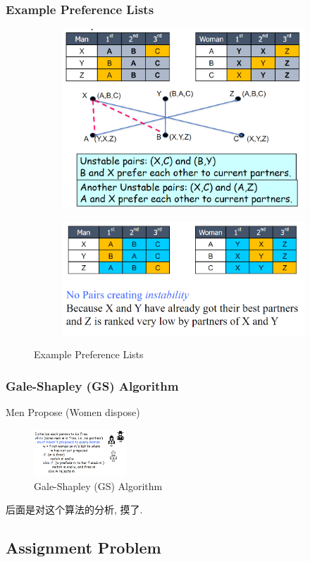 \subsubsection{Example Preference Lists}
\begin{figure}[H]
    \centering
    \begin{subfigure}{0.309\textwidth}
        \centering
        \includegraphics[width=\textwidth]{pic/DAA10/Example Preference Lists1}
    \end{subfigure}
    \begin{subfigure}{0.309\textwidth}
        \centering
        \includegraphics[width=\textwidth]{pic/DAA10/Example Preference Lists2}
    \end{subfigure}
    \caption{Example Preference Lists}
\end{figure}

\subsubsection{Gale-Shapley (GS) Algorithm}
Men Propose (Women dispose)
\begin{figure}[H]
    \centering
    \includegraphics[width=0.309\textwidth]{pic/DAA10/Gale-Shapley (GS) Algorithm}
    \caption{Gale-Shapley (GS) Algorithm}
\end{figure}

后面是对这个算法的分析, 摸了.

\subsection{Assignment Problem}
